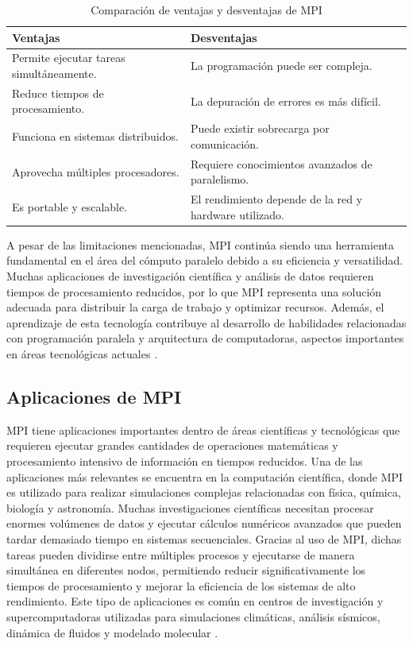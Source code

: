 \begin{table}[H]
\centering
\caption{Comparación de ventajas y desventajas de MPI \cite{ref2_frem}}
\label{tab:ventajasDesventajasMPI}
\begin{tabular}{|p{6cm}|p{6cm}|}
\hline
\textbf{Ventajas} & \textbf{Desventajas} \\ \hline
Permite ejecutar tareas simultáneamente. & La programación puede ser compleja. \\ \hline
Reduce tiempos de procesamiento. & La depuración de errores es más difícil. \\ \hline
Funciona en sistemas distribuidos. & Puede existir sobrecarga por comunicación. \\ \hline
Aprovecha múltiples procesadores. & Requiere conocimientos avanzados de paralelismo. \\ \hline
Es portable y escalable. & El rendimiento depende de la red y hardware utilizado. \\ \hline
\end{tabular}
\end{table}

A pesar de las limitaciones mencionadas, MPI continúa siendo una herramienta fundamental en el área del cómputo paralelo debido a su eficiencia y versatilidad. Muchas aplicaciones de investigación científica y análisis de datos requieren tiempos de procesamiento reducidos, por lo que MPI representa una solución adecuada para distribuir la carga de trabajo y optimizar recursos. Además, el aprendizaje de esta tecnología contribuye al desarrollo de habilidades relacionadas con programación paralela y arquitectura de computadoras, aspectos importantes en áreas tecnológicas actuales \cite{ref3_frem,ref4_frem}.

\subsection{Aplicaciones de MPI}

MPI tiene aplicaciones importantes dentro de áreas científicas y tecnológicas que requieren ejecutar grandes cantidades de operaciones matemáticas y procesamiento intensivo de información en tiempos reducidos. Una de las aplicaciones más relevantes se encuentra en la computación científica, donde MPI es utilizado para realizar simulaciones complejas relacionadas con física, química, biología y astronomía. Muchas investigaciones científicas necesitan procesar enormes volúmenes de datos y ejecutar cálculos numéricos avanzados que pueden tardar demasiado tiempo en sistemas secuenciales. Gracias al uso de MPI, dichas tareas pueden dividirse entre múltiples procesos y ejecutarse de manera simultánea en diferentes nodos, permitiendo reducir significativamente los tiempos de procesamiento y mejorar la eficiencia de los sistemas de alto rendimiento. Este tipo de aplicaciones es común en centros de investigación y supercomputadoras utilizadas para simulaciones climáticas, análisis sísmicos, dinámica de fluidos y modelado molecular \cite{ref4_frem,ref1_frem}.

